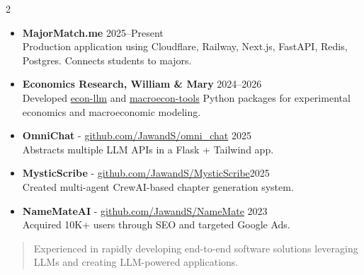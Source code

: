 \documentclass[10pt,a4paper,withhyper]{altacv}
\begin{document}
\begin{paracol}{2}
\begin{itemize}[leftmargin=*]

  \item \textbf{MajorMatch.me} \hfill 2025--Present \\
  Production application using Cloudflare, Railway, Next.js, FastAPI, Redis, Postgres. Connects students to majors.

  \item \textbf{Economics Research, William \& Mary} \hfill 2024--2026 \\
  Developed \href{https://pypi.org/project/econ-llm/}{econ-llm} and \href{https://pypi.org/project/macroecon-tools/}{macroecon-tools} Python packages for experimental economics and macroeconomic modeling.

  \item \textbf{OmniChat} - \href{https://github.com/JawandS/omni_chat}{github.com/JawandS/omni\_chat} \hfill 2025 \\
   Abstracts multiple LLM APIs in a Flask + Tailwind app.

  \item \textbf{MysticScribe} - \href{https://github.com/JawandS/MysticScribe}{github.com/JawandS/MysticScribe}\hfill 2025 \\
  Created multi-agent CrewAI-based chapter generation system.

  \item \textbf{NameMateAI} - \href{https://github.com/JawandS/NameMate}{github.com/JawandS/NameMate} \hfill 2023 \\
  Acquired 10K+ users through SEO and targeted Google Ads.

\end{itemize}

\medskip

\switchcolumn


\begin{quote}
Experienced in rapidly developing end-to-end software solutions leveraging LLMs and creating LLM-powered applications.
\end{quote}


\divider

\divider

\divider



\end{paracol}
\end{document}
